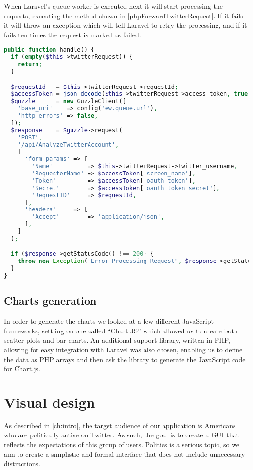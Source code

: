 When Laravel's queue worker is executed next it will start processing the
requests, executing the  method shown in
\autoref{phpForwardTwitterRequest}. If it fails it will throw an exception which
will tell Laravel to retry the processing, and if it fails ten times the request
is marked as failed.\nl

\begin{minipage}[H]{\linewidth}
\begin{lstlisting}[caption = Handle method of the ForwardTwitterRequest class,
label = phpForwardTwitterRequest, language = PHP, style = PHP]
public function handle() {
  if (empty($this->twitterRequest)) {
    return;
  }

  $requestId   = $this->twitterRequest->requestId;
  $accessToken = json_decode($this->twitterRequest->access_token, true);
  $guzzle      = new GuzzleClient([
    'base_uri'    => config('ew.queue.url'),
    'http_errors' => false,
  ]);
  $response    = $guzzle->request(
    'POST',
    '/api/AnalyzeTwitterAccount',
    [
      'form_params' => [
        'Name'          => $this->twitterRequest->twitter_username,
        'RequesterName' => $accessToken['screen_name'],
        'Token'         => $accessToken['oauth_token'],
        'Secret'        => $accessToken['oauth_token_secret'],
        'RequestID'     => $requestId,
      ],
      'headers'     => [
        'Accept'        => 'application/json',
      ],
    ]
  );

  if ($response->getStatusCode() !== 200) {
    throw new Exception("Error Processing Request", $response->getStatusCode());
  }
}
\end{lstlisting}
\end{minipage}

\subsection{Charts generation}
In order to generate the charts we looked at a few different JavaScript
frameworks, settling on one called ``Chart JS'' which allowed us to create
both scatter plots and bar charts. An additional support library, written in
PHP, allowing for easy integration with Laravel was also chosen, enabling us to
define the data as PHP arrays and then ask the library to generate the
JavaScript code for Chart.js.

\section{Visual design} \label{sec:gui-visual-design}
As described in \autoref{ch:intro}, the target audience of our application is
Americans who are politically active on Twitter. As such, the goal is to create
a GUI that reflects the expectations of this group of users. Politics is a serious
topic, so we aim to create a simplistic and formal interface that does not
include unnecessary distractions.

